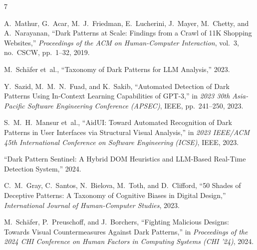 \documentclass[11pt,a4paper]{article}
\begin{document}
\begin{thebibliography}{7}

A.~Mathur, G.~Acar, M.~J.~Friedman, E.~Lucherini, J.~Mayer, M.~Chetty, and A.~Narayanan,
``Dark Patterns at Scale: Findings from a Crawl of 11K Shopping Websites,''
\textit{Proceedings of the ACM on Human-Computer Interaction}, vol.~3, no.~CSCW, pp.~1--32, 2019.

M.~Sch\"afer et~al.,
``Taxonomy of Dark Patterns for LLM Analysis,''
2023.

Y.~Sazid, M.~M.~N.~Fuad, and K.~Sakib,
``Automated Detection of Dark Patterns Using In-Context Learning Capabilities of GPT-3,''
in \textit{2023 30th Asia-Pacific Software Engineering Conference (APSEC)}, IEEE, pp.~241--250, 2023.

S.~M.~H.~Mansur et~al.,
``AidUI: Toward Automated Recognition of Dark Patterns in User Interfaces via Structural Visual Analysis,''
in \textit{2023 IEEE/ACM 45th International Conference on Software Engineering (ICSE)}, IEEE, 2023.

``Dark Pattern Sentinel: A Hybrid DOM Heuristics and LLM-Based Real-Time Detection System,''
2024.

C.~M.~Gray, C.~Santos, N.~Bielova, M.~Toth, and D.~Clifford,
``50 Shades of Deceptive Patterns: A Taxonomy of Cognitive Biases in Digital Design,''
\textit{International Journal of Human-Computer Studies}, 2023.

M.~Sch\"afer, P.~Preuschoff, and J.~Borchers,
``Fighting Malicious Designs: Towards Visual Countermeasures Against Dark Patterns,''
in \textit{Proceedings of the 2024 CHI Conference on Human Factors in Computing Systems (CHI '24)}, 2024.

\end{thebibliography}
\end{document}
